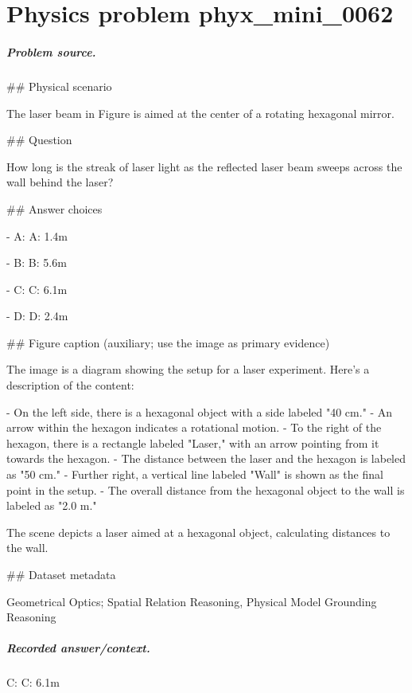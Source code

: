 
\chapter{Physics problem phyx\_mini\_0062}
\label{ch:PhyXMiniProblems_problem_phyx_mini_0062}

\paragraph{Problem source.}
\#\# Physical scenario

The laser beam in Figure is aimed at the center of a rotating hexagonal mirror.

\#\# Question

How long is the streak of laser light as the reflected laser beam sweeps across the wall behind the laser?

\#\# Answer choices

- A: A: 1.4m

- B: B: 5.6m

- C: C: 6.1m

- D: D: 2.4m

\#\# Figure caption (auxiliary; use the image as primary evidence)

The image is a diagram showing the setup for a laser experiment. Here's a description of the content:

- On the left side, there is a hexagonal object with a side labeled "40 cm."
- An arrow within the hexagon indicates a rotational motion.
- To the right of the hexagon, there is a rectangle labeled "Laser," with an arrow pointing from it towards the hexagon.
- The distance between the laser and the hexagon is labeled as "50 cm."
- Further right, a vertical line labeled "Wall" is shown as the final point in the setup.
- The overall distance from the hexagonal object to the wall is labeled as "2.0 m."

The scene depicts a laser aimed at a hexagonal object, calculating distances to the wall.

\#\# Dataset metadata

Geometrical Optics; Spatial Relation Reasoning, Physical Model Grounding Reasoning

\paragraph{Recorded answer/context.}
C: C: 6.1m

